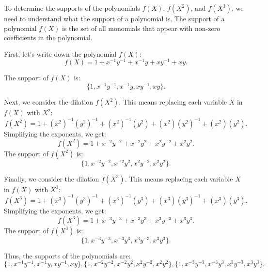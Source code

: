 To determine the supports of the polynomials \( f(X) \), \( f(X^2) \), and \( f(X^3) \), we need to understand what the support of a polynomial is. The support of a polynomial \( f(X) \) is the set of all monomials that appear with non-zero coefficients in the polynomial.

First, let's write down the polynomial \( f(X) \):
\[ f(X) = 1 + x^{-1}y^{-1} + x^{-1}y + xy^{-1} + xy. \]

The support of \( f(X) \) is:
\[ \{1, x^{-1}y^{-1}, x^{-1}y, xy^{-1}, xy\}. \]

Next, we consider the dilation \( f(X^2) \). This means replacing each variable \( X \) in \( f(X) \) with \( X^2 \):
\[ f(X^2) = 1 + (x^2)^{-1}(y^2)^{-1} + (x^2)^{-1}(y^2) + (x^2)(y^2)^{-1} + (x^2)(y^2). \]
Simplifying the exponents, we get:
\[ f(X^2) = 1 + x^{-2}y^{-2} + x^{-2}y^2 + x^2y^{-2} + x^2y^2. \]
The support of \( f(X^2) \) is:
\[ \{1, x^{-2}y^{-2}, x^{-2}y^2, x^2y^{-2}, x^2y^2\}. \]

Finally, we consider the dilation \( f(X^3) \). This means replacing each variable \( X \) in \( f(X) \) with \( X^3 \):
\[ f(X^3) = 1 + (x^3)^{-1}(y^3)^{-1} + (x^3)^{-1}(y^3) + (x^3)(y^3)^{-1} + (x^3)(y^3). \]
Simplifying the exponents, we get:
\[ f(X^3) = 1 + x^{-3}y^{-3} + x^{-3}y^3 + x^3y^{-3} + x^3y^3. \]
The support of \( f(X^3) \) is:
\[ \{1, x^{-3}y^{-3}, x^{-3}y^3, x^3y^{-3}, x^3y^3\}. \]

Thus, the supports of the polynomials are:
\[ \boxed{\{1, x^{-1}y^{-1}, x^{-1}y, xy^{-1}, xy\}, \{1, x^{-2}y^{-2}, x^{-2}y^2, x^2y^{-2}, x^2y^2\}, \{1, x^{-3}y^{-3}, x^{-3}y^3, x^3y^{-3}, x^3y^3\}}. \]